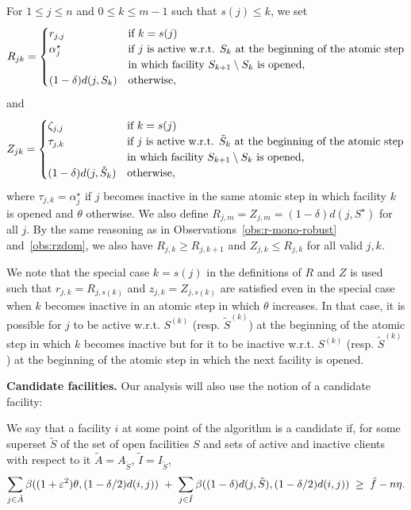 For $1 \le j \leq n$ and $0 \leq k \le m - 1$ such that $s(j) \leq k$, we set 
\[
    R_{jk} =
    \begin{cases}
        r_{j,j} & \text{if $k = s(j)$}\\
        \alpha^\star_j &
        \begin{array}[t]{@{}l@{}}
            \text{if $j$ is active w.r.t. $S_k$ at the beginning of the atomic step}\\
            \text{in which facility $S_{k+1}\setminus S_k$ is opened},
        \end{array}
        \\[2mm]
        (1-\delta)d(j,S_k) & \text{otherwise},
    \end{cases}
\]
and
\[
    Z_{jk} =
    \begin{cases}
        \zeta_{j,j} & \text{if $k = s(j)$}\\
        \tau_{j,k} &
        \begin{array}[t]{@{}l@{}}
            \text{if $j$ is active w.r.t. $\tilde S_k$ at the beginning of the atomic step}\\
            \text{in which facility $S_{k+1}\setminus S_k$ is opened},
        \end{array}
        \\[2mm]
        (1-\delta)d(j,\tilde{S}_k) & \text{otherwise},
    \end{cases}
\]
where $\tau_{j,k} = \alpha_j^\star$ if $j$ becomes inactive in the same atomic step in which facility $k$ is opened and $\theta$ otherwise.
We also define $R_{j,m}= Z_{j,m} = (1-\delta) d(j, S^\star)$ for all $j$.
By the same reasoning as in Observations~\ref{obs:r-mono-robust} and~\ref{obs:rzdom}, we also have $R_{j,k} \geq R_{j,k+1}$ and $Z_{j,k} \leq R_{j,k}$ for all valid $j, k$.

We note that the special case $k = s(j)$ in the definitions of $R$ and $Z$ is used such that $r_{j,k} = R_{j,s(k)}$ and $z_{j,k}=Z_{j,s(k)}$ are satisfied even in the special case when $k$ becomes inactive in an atomic step in which $\theta$ increases.
In that case, it is possible for $j$ to be active w.r.t. $S^{(k)}$ (resp. $\tilde{S}^{(k)}$) at the beginning of the atomic step in which $k$ becomes inactive but for it to be inactive w.r.t. $S^{(k)}$ (resp. $\tilde{S}^{(k)}$) at the beginning of the atomic step in which the next facility is opened.


\textbf{Candidate facilities.}
Our analysis will also use the notion of a candidate facility:
\begin{definition}
We say that a facility $i$ at some point of the algorithm is a candidate if, for some superset $\tilde S$ of the set of open facilities $S$ and sets of active and inactive clients with respect to it $\tilde A=A_{\tilde S}$, $\tilde I = I_{\tilde S}$,
\begin{align*}
    \sum_{j\in \tilde A}\beta((1+\varepsilon^2) \theta, (1- \delta/2)d(i,j))
    \;+\;
    \sum_{j\in \tilde I}\beta((1-\delta)d(j,\tilde S), (1-\delta/2)d(i,j))
    \;\ge\; \hat f - n \eta.
\end{align*}   
\end{definition}


